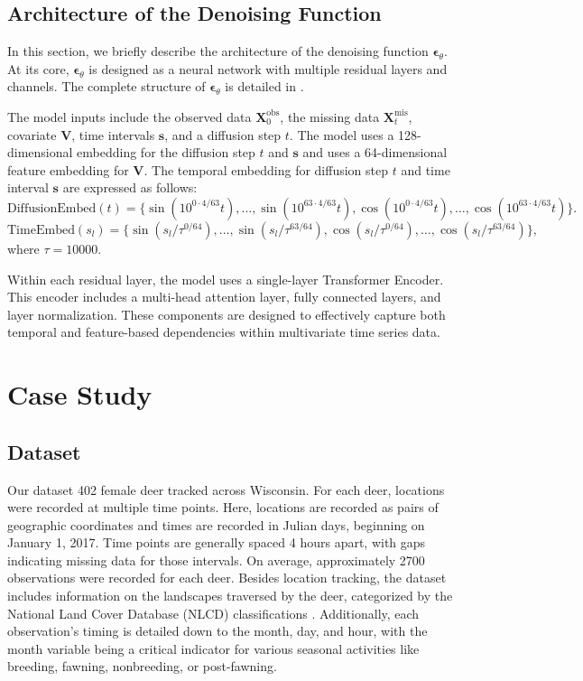 \documentclass[11pt]{article}
\begin{document}
\subsection{Architecture of the Denoising Function}
In this section, we briefly describe the architecture of the denoising function $\bm{\epsilon}_{\theta}$. At its core, $\bm{\epsilon}_{\theta}$ is designed as a neural network with multiple residual layers and channels. The complete structure of $\bm{\epsilon}_{\theta}$ is detailed in \citet{tashiro2021csdi}.

The model inputs include the observed data $\bm{X}_0^{\mathrm{obs}}$, the missing data $\bm{X}_t^{\mathrm{mis}}$, covariate $\bm{V}$, time intervals $\bm{s}$, and a diffusion step $t$. The model uses a 128-dimensional embedding for 
the diffusion step $t$ and $\bm{s}$ \citep{vaswani2017attention} and uses a 64-dimensional feature embedding for $\bm{V}$. The temporal embedding for diffusion step $t$ and time interval $\bm{s}$ are expressed as follows:
\begin{equation}
	\mathrm{DiffusionEmbed}(t)=\{\sin(10^{0\cdot 4/63}t),\ldots, \sin(10^{63\cdot 4/63}t), \cos(10^{0\cdot 4/63}t),\ldots,\cos(10^{63\cdot 4/63}t)\}.
\end{equation}
\begin{equation}
	\mathrm{TimeEmbed}(s_l)=\{\sin(s_l/\tau^{0/64}),\ldots, \sin(s_l/\tau^{63/64}), \cos(s_l/\tau^{0/64}),\ldots,\cos(s_l/\tau^{63/64})\},
\end{equation}
where $\tau=10000$. 


Within each residual layer, the model uses a single-layer Transformer Encoder. This encoder includes a multi-head attention layer, fully connected layers, and layer normalization. These components are designed to effectively capture both temporal and feature-based dependencies within multivariate time series data. 







\section{Case Study}
\subsection{Dataset}
Our dataset 402 female deer tracked across Wisconsin. For each deer, locations were recorded at multiple time points. Here, locations are recorded as pairs of geographic coordinates and times are recorded in Julian days, beginning on January 1, 2017. Time points are generally spaced 4 hours apart, with gaps indicating missing data for those intervals. On average, approximately 2700 observations were recorded for each deer. Besides location tracking, the dataset includes information on the landscapes traversed by the deer, categorized by the National Land Cover Database (NLCD) classifications \citep{usgs_nlcd_2011}. Additionally, each observation's timing is detailed down to the month, day, and hour, with the month variable being a critical indicator for various seasonal activities like breeding, fawning, nonbreeding, or post-fawning.
\end{document}

